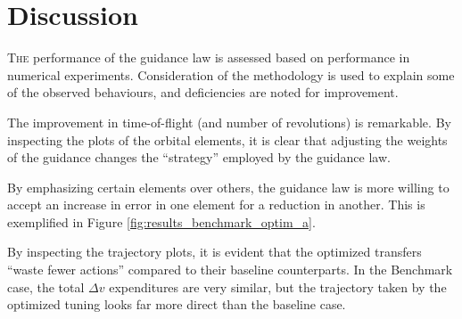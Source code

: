 \chapter{Discussion}
\label{chp:discussion}

\lettrine{T}{he} performance of the guidance law is assessed based on performance in numerical experiments. Consideration of the methodology is used to explain some of the observed behaviours, and deficiencies are noted for improvement.

The improvement in time-of-flight (and number of revolutions) is remarkable. By inspecting the plots of the orbital elements, it is clear that adjusting the weights of the guidance changes the ``strategy'' employed by the guidance law.

By emphasizing certain elements over others, the guidance law is more willing to accept an increase in error in one element for a reduction in another. This is exemplified in Figure \ref{fig:results_benchmark_optim_a}.

By inspecting the trajectory plots, it is evident that the optimized transfers ``waste fewer actions'' compared to their baseline counterparts. In the Benchmark case, the total \(\Delta v\) expenditures are very similar, but the trajectory taken by the optimized tuning looks far more direct than the baseline case.